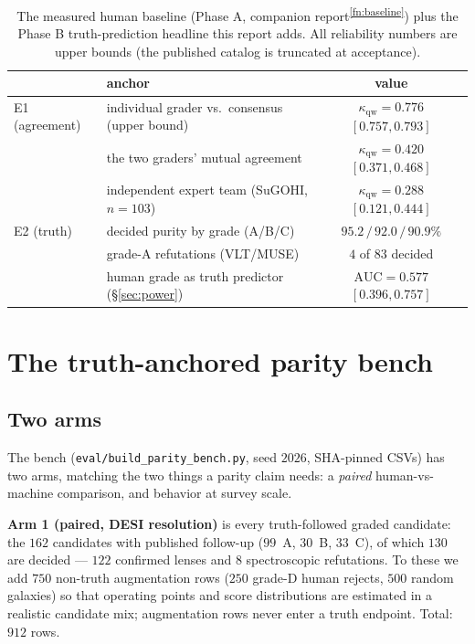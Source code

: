 \documentclass[11pt,letterpaper]{article}
\newcommand{\qwk}{\ensuremath{\kappa_{\mathrm{qw}}}}
\begin{document}
\begin{table}[t]
\centering\small
\begin{tabular}{llc}
\toprule
 & anchor & value \\
\midrule
E1 (agreement) & individual grader vs.\ consensus (upper bound) & $\qwk=0.776$ $[0.757,0.793]$ \\
               & the two graders' mutual agreement              & $\qwk=0.420$ $[0.371,0.468]$ \\
               & independent expert team (SuGOHI, $n=103$)      & $\qwk=0.288$ $[0.121,0.444]$ \\
E2 (truth)     & decided purity by grade (A/B/C)                & $95.2\,/\,92.0\,/\,90.9\%$ \\
               & grade-A refutations (VLT/MUSE)                 & $4$ of $83$ decided \\
               & human grade as truth predictor (\S\ref{sec:power}) & $\mathrm{AUC}=0.577$ $[0.396,0.757]$ \\
\bottomrule
\end{tabular}
\caption{The measured human baseline (Phase A, companion
report\textsuperscript{\ref{fn:baseline}}) plus the Phase B truth-prediction headline
this report adds. All reliability numbers are upper bounds (the published catalog is
truncated at acceptance).}\label{tab:anchors}
\end{table}

\section{The truth-anchored parity bench}\label{sec:bench}

\subsection{Two arms}\label{sec:arms}
The bench (\texttt{eval/build\_parity\_bench.py}, seed $2026$, SHA-pinned CSVs) has two
arms, matching the two things a parity claim needs: a \emph{paired} human-vs-machine
comparison, and behavior at survey scale.

\textbf{Arm 1 (paired, DESI resolution)} is every truth-followed graded candidate: the
$162$ candidates with published follow-up ($99$~A, $30$~B, $33$~C), of which $130$ are
decided --- $122$ confirmed lenses and $8$ spectroscopic refutations. To these we add
$750$ non-truth augmentation rows ($250$ grade-D human rejects, $500$ random galaxies)
so that operating points and score distributions are estimated in a realistic
candidate mix; augmentation rows never enter a truth endpoint. Total: $912$ rows.
\end{document}
